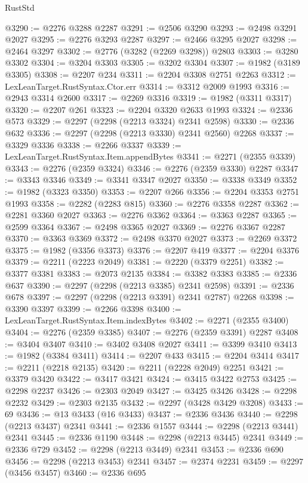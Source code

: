 \begin{lexlean}{RustStd}
\begin{coremodule}
@3290 := @2276 @3288 @2287
@3291 := @2506 @3290
@3293 := @2498 @3291 @2027
@3295 := @2276 @3293 @2287
@3297 := @2466 @3295 @2027
@3298 := @2464 @3297
@3302 := @2776 (@3282 (@2269 @3298)) @2803
@3303 := @3280 @3302
@3304 := @3204 @3303
@3305 := @3202 @3304
@3307 := @1982 (@3189 @3305)
@3308 := @2207 @234
@3311 := @2204 @3308 @2751 @2263
@3312 := LexLeanTarget.RustSyntax.Ctor.err
@3314 := @3312 @2009 @1993
@3316 := @2943 @3314 @2600
@3317 := @2269 @3316
@3319 := @1982 (@3311 @3317)
@3320 := @2207 @261
@3323 := @2204 @3320 @2633 @1993
@3324 := @2336 @573
@3329 := @2297 (@2298 (@2213 @3324) @2341 @2598)
@3330 := @2336 @632
@3336 := @2297 (@2298 (@2213 @3330) @2341 @2560) @2268
@3337 := @3329 @3336
@3338 := @2266 @3337
@3339 := LexLeanTarget.RustSyntax.Item.appendBytes
@3341 := @2271 (@2355 @3339)
@3343 := @2276 (@2359 @3324)
@3346 := @2276 (@2359 @3330) @2287
@3347 := @3343 @3346
@3349 := @3341 @3347 @2027
@3350 := @3338 @3349
@3352 := @1982 (@3323 @3350)
@3353 := @2207 @266
@3356 := @2204 @3353 @2751 @1993
@3358 := @2282 (@2283 @815)
@3360 := @2276 @3358 @2287
@3362 := @2281 @3360 @2027
@3363 := @2276 @3362
@3364 := @3363 @2287
@3365 := @2599 @3364
@3367 := @2498 @3365 @2027
@3369 := @2276 @3367 @2287
@3370 := @3363 @3369
@3372 := @2498 @3370 @2027
@3373 := @2269 @3372
@3375 := @1982 (@3356 @3373)
@3376 := @2207 @419
@3377 := @2204 @3376
@3379 := @2211 (@2223 @2049)
@3381 := @2220 (@3379 @2251)
@3382 := @3377 @3381
@3383 := @2073 @2135
@3384 := @3382 @3383
@3385 := @2336 @637
@3390 := @2297 (@2298 (@2213 @3385) @2341 @2598)
@3391 := @2336 @678
@3397 := @2297 (@2298 (@2213 @3391) @2341 @2787) @2268
@3398 := @3390 @3397
@3399 := @2266 @3398
@3400 := LexLeanTarget.RustSyntax.Item.indexBytes
@3402 := @2271 (@2355 @3400)
@3404 := @2276 (@2359 @3385)
@3407 := @2276 (@2359 @3391) @2287
@3408 := @3404 @3407
@3410 := @3402 @3408 @2027
@3411 := @3399 @3410
@3413 := @1982 (@3384 @3411)
@3414 := @2207 @433
@3415 := @2204 @3414
@3417 := @2211 (@2218 @2135)
@3420 := @2211 (@2228 @2049) @2251
@3421 := @3379 @3420
@3422 := @3417 @3421
@3424 := @3415 @3422 @2753
@3425 := @2298 @2237
@3426 := @2303 @2049
@3427 := @3425 @3426
@3428 := @2298 @2232
@3429 := @2303 @2135
@3432 := @2297 (@3428 @3429 @3208)
@3433 := 69
@3436 := @13 @3433 (@16 @3433)
@3437 := @2336 @3436
@3440 := @2298 (@2213 @3437) @2341
@3441 := @2336 @1557
@3444 := @2298 (@2213 @3441) @2341
@3445 := @2336 @1190
@3448 := @2298 (@2213 @3445) @2341
@3449 := @2336 @729
@3452 := @2298 (@2213 @3449) @2341
@3453 := @2336 @690
@3456 := @2298 (@2213 @3453) @2341
@3457 := @2374 @2231
@3459 := @2297 (@3456 @3457)
@3460 := @2336 @695

\end{coremodule}
\end{lexlean}
